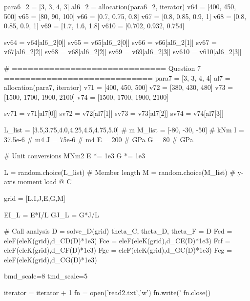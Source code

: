 \documentclass[a4paper,11pt]{article}
\begin{document}
\begin{pycode}
	para6_2 = [3, 3, 4, 3]
	al6_2 = allocation(para6_2, iterator)
	v64 = [400, 450, 500]
	v65 = [80, 90, 100]
	v66 = [0.7, 0.75, 0.8]
	v67 = [0.8, 0.85, 0.9, 1]
	v68 = [0.8, 0.85, 0.9, 1]
	v69 = [1.7, 1.6, 1.8]
	v610 = [0.702, 0.932, 0.754]
	
	sv64 = v64[al6_2[0]]
	sv65 = v65[al6_2[0]]
	sv66 = v66[al6_2[1]]
	sv67 = v67[al6_2[2]]
	sv68 = v68[al6_2[2]]
	sv69 = v69[al6_2[3]]
	sv610 = v610[al6_2[3]]
	
	# ============================= Question 7 ============================
	para7 = [3, 3, 4, 4]
	al7 = allocation(para7, iterator)
	v71 = [400, 450, 500]
	v72 = [380, 430, 480]
	v73 = [1500, 1700, 1900, 2100]
	v74 = [1500, 1700, 1900, 2100]
	
	sv71 = v71[al7[0]]
	sv72 = v72[al7[1]]
	sv73 = v73[al7[2]]
	sv74 = v74[al7[3]]
	
	L_list = [3.5,3.75,4.0,4.25,4.5,4.75,5.0]  # m
	M_list = [-80, -30, -50]	# kNm
	I = 37.5e-6 	# m4
	J = 75e-6   	# m4
	E = 200     	# GPa
	G = 80      	# GPa
	
	# Unit conversions MNm2
	E *= 1e3
	G *= 1e3
	
	L = random.choice(L_list) 		# Member length
	M = random.choice(M_list) 		# y-axis moment load @ C
	
	grid = [L,I,J,E,G,M]
	
	EI_L = E*I/L
	GJ_L = G*J/L
	
	# Call analysis
	D = solve_D(grid)
	theta_C, theta_D, theta_F = D
	Fcd = eleF(eleK(grid),d_CD(D)*1e3)
	Fce = eleF(eleK(grid),d_CE(D)*1e3)
	Fcf = eleF(eleK(grid),d_CF(D)*1e3)
	Fgc = eleF(eleK(grid),d_GC(D)*1e3)
	Fcg = eleF(eleK(grid),d_CG(D)*1e3)
	
	bmd_scale=8
	tmd_scale=5
	
	iterator = iterator + 1
	fn = open('read2.txt','w')
	fn.write('%
	fn.close()
\end{pycode}
\end{document}
